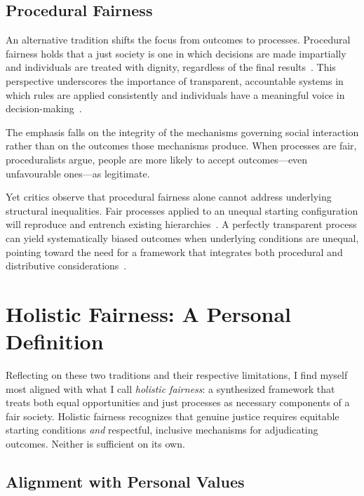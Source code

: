 \documentclass[11pt]{../shared/essay/essay}
\begin{document}
\subsection{Procedural Fairness}

An alternative tradition shifts the focus from outcomes to processes. Procedural fairness holds
that a just society is one in which decisions are made impartially and individuals are treated
with dignity, regardless of the final results~\cite{dahlstrom,basic_procedural}. This
perspective underscores the importance of transparent, accountable systems in which rules are
applied consistently and individuals have a meaningful voice in decision-making~\cite{canada2017}.

The emphasis falls on the integrity of the mechanisms governing social interaction rather than
on the outcomes those mechanisms produce. When processes are fair, proceduralists argue,
people are more likely to accept outcomes---even unfavourable ones---as legitimate.

Yet critics observe that procedural fairness alone cannot address underlying structural
inequalities. Fair processes applied to an unequal starting configuration will reproduce and
entrench existing hierarchies~\cite{macdonald1980,galligan1997}. A perfectly transparent
process can yield systematically biased outcomes when underlying conditions are unequal,
pointing toward the need for a framework that integrates both procedural and distributive
considerations~\cite{ferguson2013,rescher2003,morse2021}.

\section{Holistic Fairness: A Personal Definition}

Reflecting on these two traditions and their respective limitations, I find myself most aligned
with what I call \textit{holistic fairness}: a synthesized framework that treats both equal
opportunities and just processes as necessary components of a fair society. Holistic fairness
recognizes that genuine justice requires equitable starting conditions \textit{and} respectful,
inclusive mechanisms for adjudicating outcomes. Neither is sufficient on its own.

\subsection{Alignment with Personal Values}
\end{document}
